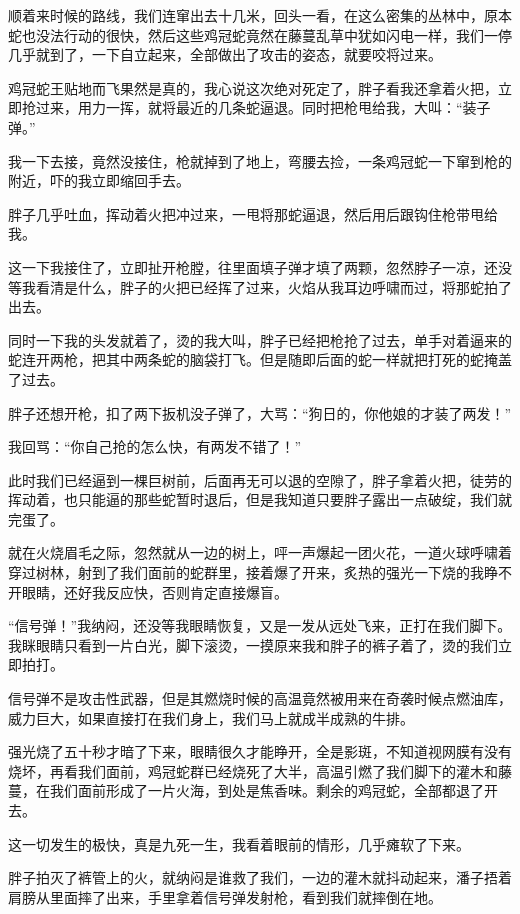 顺着来时候的路线，我们连窜出去十几米，回头一看，在这么密集的丛林中，原本蛇也没法行动的很快，然后这些鸡冠蛇竟然在藤蔓乱草中犹如闪电一样，我们一停几乎就到了，一下自立起来，全部做出了攻击的姿态，就要咬将过来。

鸡冠蛇王贴地而飞果然是真的，我心说这次绝对死定了，胖子看我还拿着火把，立即抢过来，用力一挥，就将最近的几条蛇逼退。同时把枪甩给我，大叫：“装子弹。”

我一下去接，竟然没接住，枪就掉到了地上，弯腰去捡，一条鸡冠蛇一下窜到枪的附近，吓的我立即缩回手去。

胖子几乎吐血，挥动着火把冲过来，一甩将那蛇逼退，然后用后跟钩住枪带甩给我。

这一下我接住了，立即扯开枪膛，往里面填子弹才填了两颗，忽然脖子一凉，还没等我看清是什么，胖子的火把已经挥了过来，火焰从我耳边呼啸而过，将那蛇拍了出去。

同时一下我的头发就着了，烫的我大叫，胖子已经把枪抢了过去，单手对着逼来的蛇连开两枪，把其中两条蛇的脑袋打飞。但是随即后面的蛇一样就把打死的蛇掩盖了过去。

胖子还想开枪，扣了两下扳机没子弹了，大骂：“狗日的，你他娘的才装了两发！”

我回骂：“你自己抢的怎么快，有两发不错了！”

此时我们已经逼到一棵巨树前，后面再无可以退的空隙了，胖子拿着火把，徒劳的挥动着，也只能逼的那些蛇暂时退后，但是我知道只要胖子露出一点破绽，我们就完蛋了。

就在火烧眉毛之际，忽然就从一边的树上，呯一声爆起一团火花，一道火球呼啸着穿过树林，射到了我们面前的蛇群里，接着爆了开来，炙热的强光一下烧的我睁不开眼睛，还好我反应快，否则肯定直接爆盲。

“信号弹！”我纳闷，还没等我眼睛恢复，又是一发从远处飞来，正打在我们脚下。我眯眼睛只看到一片白光，脚下滚烫，一摸原来我和胖子的裤子着了，烫的我们立即拍打。

信号弹不是攻击性武器，但是其燃烧时候的高温竟然被用来在奇袭时候点燃油库，威力巨大，如果直接打在我们身上，我们马上就成半成熟的牛排。

强光烧了五十秒才暗了下来，眼睛很久才能睁开，全是影斑，不知道视网膜有没有烧坏，再看我们面前，鸡冠蛇群已经烧死了大半，高温引燃了我们脚下的灌木和藤蔓，在我们面前形成了一片火海，到处是焦香味。剩余的鸡冠蛇，全部都退了开去。

这一切发生的极快，真是九死一生，我看着眼前的情形，几乎瘫软了下来。

胖子拍灭了裤管上的火，就纳闷是谁救了我们，一边的灌木就抖动起来，潘子捂着肩膀从里面摔了出来，手里拿着信号弹发射枪，看到我们就摔倒在地。

